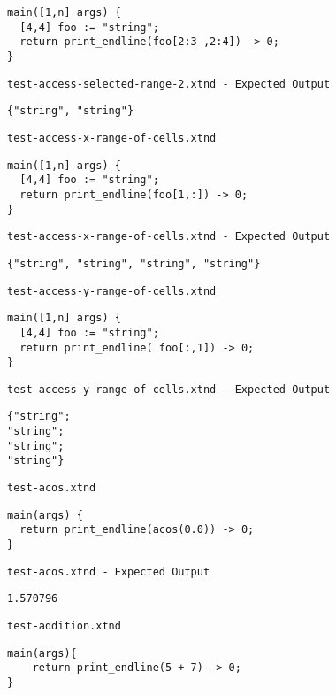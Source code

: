 \begin{lstlisting}
main([1,n] args) {
  [4,4] foo := "string";
  return print_endline(foo[2:3 ,2:4]) -> 0;
}
\end{lstlisting}


\medskip \noindent \texttt{test-access-selected-range-2.xtnd - Expected Output}


\begin{lstlisting}
{"string", "string"}
\end{lstlisting}


\medskip \noindent \texttt{test-access-x-range-of-cells.xtnd}


\begin{lstlisting}
main([1,n] args) {
  [4,4] foo := "string";
  return print_endline(foo[1,:]) -> 0;
}
\end{lstlisting}


\medskip \noindent \texttt{test-access-x-range-of-cells.xtnd - Expected Output}


\begin{lstlisting}
{"string", "string", "string", "string"}
\end{lstlisting}


\medskip \noindent \texttt{test-access-y-range-of-cells.xtnd}


\begin{lstlisting}
main([1,n] args) {
  [4,4] foo := "string";
  return print_endline( foo[:,1]) -> 0;
}
\end{lstlisting}


\medskip \noindent \texttt{test-access-y-range-of-cells.xtnd - Expected Output}


\begin{lstlisting}
{"string";
"string";
"string";
"string"}
\end{lstlisting}


\medskip \noindent \texttt{test-acos.xtnd}


\begin{lstlisting}
main(args) {
  return print_endline(acos(0.0)) -> 0;
}
\end{lstlisting}


\medskip \noindent \texttt{test-acos.xtnd - Expected Output}


\begin{lstlisting}
1.570796
\end{lstlisting}


\medskip \noindent \texttt{test-addition.xtnd}


\begin{lstlisting}
main(args){
	return print_endline(5 + 7) -> 0;
}
\end{lstlisting}


